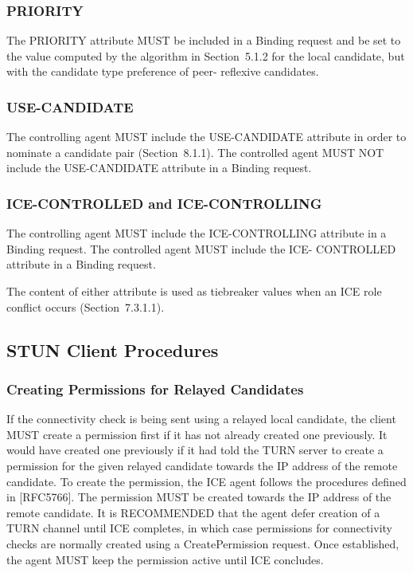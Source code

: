 \documentclass{article}
\begin{document}
\subsubsection{PRIORITY}

The PRIORITY attribute MUST be included in a Binding request and be set to the value computed by the algorithm in Section~5.1.2 for the local candidate, but with the candidate type preference of peer- reflexive candidates.

\subsubsection{USE-CANDIDATE}

The controlling agent MUST include the USE-CANDIDATE attribute in order to nominate a candidate pair (Section~8.1.1).  The controlled agent MUST NOT include the USE-CANDIDATE attribute in a Binding request.

\subsubsection{ICE-CONTROLLED and ICE-CONTROLLING}

The controlling agent MUST include the ICE-CONTROLLING attribute in a Binding request.  The controlled agent MUST include the ICE- CONTROLLED attribute in a Binding request.

The content of either attribute is used as tiebreaker values when an ICE role conflict occurs (Section~7.3.1.1).

\subsection{STUN Client Procedures}

\subsubsection{Creating Permissions for Relayed Candidates}

If the connectivity check is being sent using a relayed local candidate, the client MUST create a permission first if it has not already created one previously.  It would have created one previously if it had told the TURN server to create a permission for the given relayed candidate towards the IP address of the remote candidate.  To create the permission, the ICE agent follows the procedures defined in [RFC5766].  The permission MUST be created towards the IP address of the remote candidate.  It is RECOMMENDED that the agent defer creation of a TURN channel until ICE completes, in which case permissions for connectivity checks are normally created using a CreatePermission request.  Once established, the agent MUST keep the permission active until ICE concludes.
\end{document}
